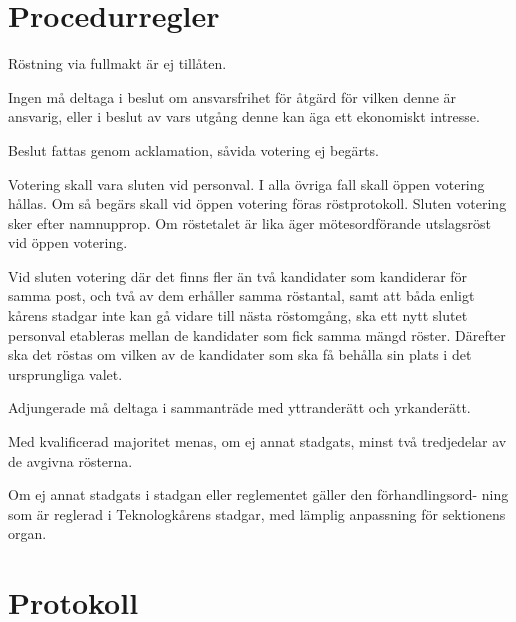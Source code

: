 \documentclass[stadgar]{dsekprotokoll}
\begin{document}
\section{Procedurregler}

\begin{stadgeavsnitt}


Röstning via fullmakt är ej tillåten.


Ingen må deltaga i beslut om ansvarsfrihet för åtgärd för vilken denne är ansvarig, 
eller i beslut av vars utgång denne kan äga
ett ekonomiskt intresse.


Beslut fattas genom acklamation, såvida votering ej begärts.


Votering skall vara sluten vid personval. I alla övriga fall skall öppen
votering hållas. Om så begärs skall vid öppen votering föras röstprotokoll.
Sluten votering sker efter namnupprop. Om röstetalet är lika äger
mötesordförande utslagsröst vid öppen votering.

Vid sluten votering där det finns fler än två kandidater som kandiderar för samma post, 
och två av dem erhåller samma röstantal, samt att båda enligt kårens stadgar inte kan gå 
vidare till nästa röstomgång, ska ett nytt slutet personval etableras mellan de kandidater
som fick samma mängd röster. Därefter ska det röstas om vilken av de kandidater som ska få 
behålla sin plats i det ursprungliga valet.


Adjungerade må deltaga i sammanträde med yttranderätt och yrkanderätt.


Med kvalificerad majoritet menas, om ej annat stadgats, minst två
tredjedelar av de avgivna rösterna.


Om ej annat stadgats i stadgan eller reglementet gäller den förhandlingsord- ning som är reglerad i Teknologkårens stadgar, med lämplig anpassning för sektionens organ.

\end{stadgeavsnitt}

\section{Protokoll}
\end{document}
